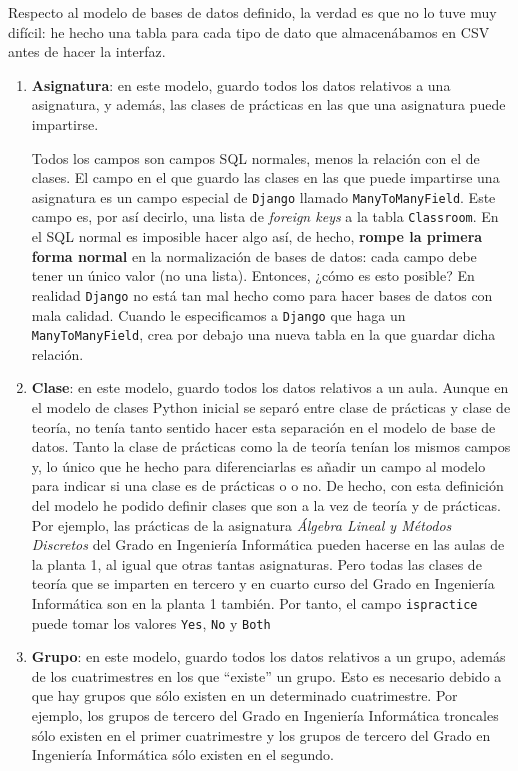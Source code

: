 Respecto al modelo de bases de datos definido, la verdad es que no lo tuve muy difícil: he hecho una tabla para cada tipo de dato que almacenábamos en CSV antes de hacer la interfaz.

\begin{enumerate}[---]
    \item \textbf{Asignatura}: en este modelo, guardo todos los datos relativos a una asignatura, y además, las clases de prácticas en las que una asignatura puede impartirse.

Todos los campos son campos SQL normales, menos la relación con el de clases. El campo en el que guardo las clases en las que puede impartirse una asignatura es un campo especial de \texttt{Django} llamado \texttt{ManyToManyField}. Este campo es, por así decirlo, una lista de \textit{foreign keys} a la tabla \texttt{Classroom}. En el SQL normal es imposible hacer algo así, de hecho, \textbf{rompe la primera forma normal} en la normalización de bases de datos: cada campo debe tener un único valor (no una lista). Entonces, ¿cómo es esto posible? En realidad \texttt{Django} no está tan mal hecho como para hacer bases de datos con mala calidad. Cuando le especificamos a \texttt{Django} que haga un \texttt{ManyToManyField}, crea por debajo una nueva tabla en la que guardar dicha relación.

    \item \textbf{Clase}: en este modelo, guardo todos los datos relativos a un aula. Aunque en el modelo de clases Python inicial se separó entre clase de prácticas y clase de teoría, no tenía tanto sentido hacer esta separación en el modelo de base de datos. Tanto la clase de prácticas como la de teoría tenían los mismos campos y, lo único que he hecho para diferenciarlas es añadir un campo al modelo para indicar si una clase es de prácticas o o no. De hecho, con esta definición del modelo he podido definir clases que son a la vez de teoría y de prácticas. Por ejemplo, las prácticas de la asignatura \textit{Álgebra Lineal y Métodos Discretos} del Grado en Ingeniería Informática pueden hacerse en las aulas de la planta 1, al igual que otras tantas asignaturas. Pero todas las clases de teoría que se imparten en tercero y en cuarto curso del Grado en Ingeniería Informática son en la planta 1 también. Por tanto, el campo \texttt{ispractice} puede tomar los valores \texttt{Yes}, \texttt{No} y \texttt{Both}


    \item \textbf{Grupo}: en este modelo, guardo todos los datos relativos a un grupo, además de los cuatrimestres en los que ``existe'' un grupo. Esto es necesario debido a que hay grupos que sólo existen en un determinado cuatrimestre. Por ejemplo, los grupos de tercero del Grado en Ingeniería Informática troncales sólo existen en el primer cuatrimestre y los grupos de tercero del Grado en Ingeniería Informática sólo existen en el segundo. 


\end{enumerate}

